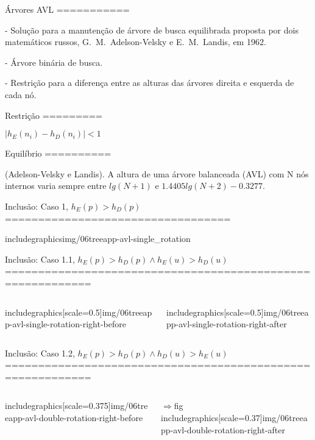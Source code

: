 
Árvores AVL
===========
    
- Solução para a manutenção de árvore de busca equilibrada
    proposta por dois matemáticos russos, G.\ M.\ Adelson-Velsky e E.\
    M.\ Landis, em 1962.

- Árvore binária de busca.
    
- Restrição para a diferença entre as alturas das árvores
    direita e esquerda de cada nó.


Restrição
=========

  $|h_E(n_i)-h_D(n_i)|<1$


Equilíbrio
==========

  \begin{theorem}
    (Adelson-Velsky e Landis). A altura de uma árvore balanceada (AVL) com N nós internos varia
    sempre entre $lg(N+1)$ e $1.4405lg(N+2)-0.3277$.
  \end{theorem}



Inclusão: Caso 1, $h_E(p) > h_D(p)$
==================================

includegraphics{img/06treeapp-avl-single_rotation}

Inclusão: Caso 1.1, $h_E(p) > h_D(p) \land h_E(u) > h_D(u)$
===========================================================

\begin{columns}
\begin{column}{0.5\textwidth}
 includegraphics[scale=0.5]{img/06treeapp-avl-single-rotation-right-before}
\end{column}
\begin{column}{0.5\textwidth}
includegraphics[scale=0.5]{img/06treeapp-avl-single-rotation-right-after}
\end{column}
\end{columns}

Inclusão: Caso 1.2, $h_E(p) > h_D(p) \land h_D(u) > h_E(u)$
===========================================================

\begin{columns}
\begin{column}{0.35\textwidth}
includegraphics[scale=0.375]{img/06treeapp-avl-double-rotation-right-before}
\end{column}
\begin{column}{0.65\textwidth}
$\Rightarrow$fig
includegraphics[scale=0.37]{img/06treeapp-avl-double-rotation-right-after}
\end{column}
\end{columns}

